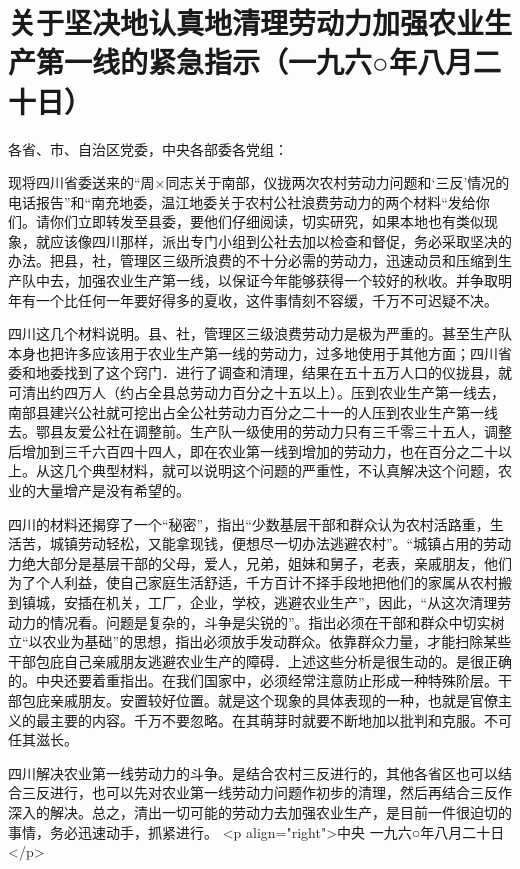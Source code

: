 \section[关于坚决地认真地清理劳动力加强农业生产第一线的紧急指示（一九六○年八月二十日）]{关于坚决地认真地清理劳动力加强农业生产第一线的紧急指示（一九六○年八月二十日）}


各省、市、自治区党委，中央各部委各党组：

现将四川省委送来的“周×同志关于南部，仪拢两次农村劳动力问题和‘三反’情况的电话报告”和“南充地委，温江地委关于农村公社浪费劳动力的两个材料“发给你们。请你们立即转发至县委，要他们仔细阅读，切实研究，如果本地也有类似现象，就应该像四川那样，派出专门小组到公社去加以检查和督促，务必采取坚决的办法。把县，社，管理区三级所浪费的不十分必需的劳动力，迅速动员和压缩到生产队中去，加强农业生产第一线，以保证今年能够获得一个较好的秋收。并争取明年有一个比任何一年要好得多的夏收，这件事情刻不容缓，千万不可迟疑不决。

四川这几个材料说明。县、社，管理区三级浪费劳动力是极为严重的。甚至生产队本身也把许多应该用于农业生产第一线的劳动力，过多地使用于其他方面；四川省委和地委找到了这个窍门．进行了调查和清理，结果在五十五万人口的仪拢县，就可清出约四万人（约占全县总劳动力百分之十五以上）。压到农业生产第一线去，南部县建兴公社就可挖出占全公社劳动力百分之二十一的人压到农业生产第一线去。鄂县友爱公社在调整前。生产队一级使用的劳动力只有三千零三十五人，调整后增加到三千六百四十四人，即在农业第一线到增加的劳动力，也在百分之二十以上。从这几个典型材料，就可以说明这个问题的严重性，不认真解决这个问题，农业的大量增产是没有希望的。

四川的材料还揭穿了一个“秘密”，指出“少数基层干部和群众认为农村活路重，生活苦，城镇劳动轻松，又能拿现钱，便想尽一切办法逃避农村”。“城镇占用的劳动力绝大部分是基层干部的父母，爱人，兄弟，姐妹和舅子，老表，亲戚朋友，他们为了个人利益，使自己家庭生活舒适，千方百计不择手段地把他们的家属从农村搬到镇城，安插在机关，工厂，企业，学校，逃避农业生产”，因此，“从这次清理劳动力的情况看。问题是复杂的，斗争是尖锐的”。指出必须在干部和群众中切实树立“以农业为基础”的思想，指出必须放手发动群众。依靠群众力量，才能扫除某些干部包庇自己亲戚朋友逃避农业生产的障碍．上述这些分析是很生动的。是很正确的。中央还要着重指出。在我们国家中，必须经常注意防止形成一种特殊阶层。干部包庇亲戚朋友。安置较好位置。就是这个现象的具体表现的一种，也就是官僚主义的最主要的内容。千万不要忽略。在其萌芽时就要不断地加以批判和克服。不可任其滋长。

四川解决农业第一线劳动力的斗争。是结合农村三反进行的，其他各省区也可以结合三反进行，也可以先对农业第一线劳动力问题作初步的清理，然后再结合三反作深入的解决。总之，清出一切可能的劳动力去加强农业生产，是目前一件很迫切的事情，务必迅速动手，抓紧进行。
<p align="right">中央
一九六○年八月二十日</p>


